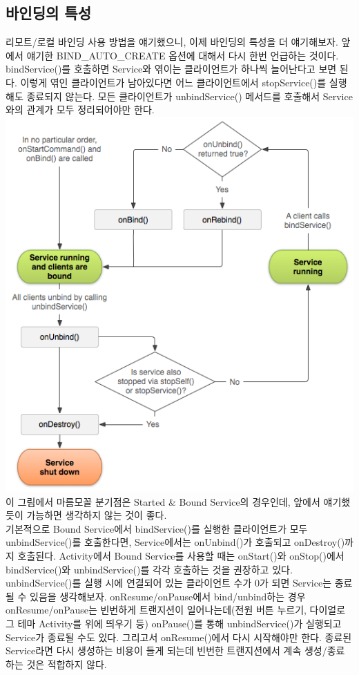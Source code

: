 \subsection{바인딩의 특성}
\label{subsec:binding_special}
리모트/로컬 바인딩 사용 방법을 얘기했으니, 이제 바인딩의 특성을 더 얘기해보자. 앞에서 얘기한 BIND\_AUTO\_CREATE 옵션에 대해서 다시 한번 언급하는 것이다. 
bindService()를 호출하면 Service와 엮이는 클라이언트가 하나씩 늘어난다고 보면 된다. 
이렇게 엮인 클라이언트가 남아있다면 어느 클라이언트에서 stopService()를 실행해도 종료되지 않는다. 모든 클라이언트가 unbindService() 메서드를 호출해서 Service와의 관계가 모두 정리되어야만 한다.\\
\includegraphics[scale=0.5]{service-binding-tree-lifecycle}\\
이 그림에서 마름모꼴 분기점은 Started \& Bound Service의 경우인데, 앞에서 얘기했듯이 가능하면 생각하지 않는 것이 좋다.\\

기본적으로 Bound Service에서 bindService()를 실행한 클라이언트가 모두 unbindService()를 호출한다면, Service에서는 onUnbind()가 호출되고 onDestroy()까지 호출된다.
Activity에서 Bound Service를 사용할 때는 onStart()와 onStop()에서 bindService()와 unbindService()를 각각 호출하는 것을 권장하고 있다. unbindService()를 실행 시에 연결되어 있는 클라이언트 수가 0가 되면 Service는 종료될 수 있음을 생각해보자. onResume/onPause에서 bind/unbind하는 경우 onResume/onPause는 빈번하게 트랜지션이 일어나는데(전원 버튼 누르기, 다이얼로그 테마 Activity를 위에 띄우기 등) onPause()를 통해 unbindService()가 실행되고 Service가 종료될 수도 있다. 
그리고서 onResume()에서 다시 시작해야만 한다. 종료된 Service라면 다시 생성하는 비용이 들게 되는데 빈번한 트랜지션에서 계속 생성/종료하는 것은 적합하지 않다.\\

